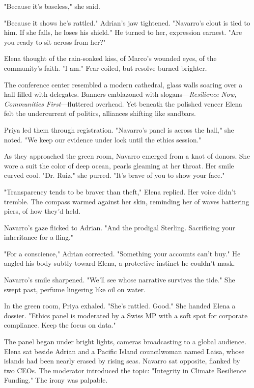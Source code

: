 "Because it's baseless," she said.

"Because it shows he's rattled." Adrian's jaw tightened. "Navarro's clout is tied to him. If she falls, he loses his shield." He turned to her, expression earnest. "Are you ready to sit across from her?"

Elena thought of the rain-soaked kiss, of Marco's wounded eyes, of the community's faith. "I am." Fear coiled, but resolve burned brighter.

The conference center resembled a modern cathedral, glass walls soaring over a hall filled with delegates. Banners emblazoned with slogans—\textit{Resilience Now}, \textit{Communities First}—fluttered overhead. Yet beneath the polished veneer Elena felt the undercurrent of politics, alliances shifting like sandbars.

Priya led them through registration. "Navarro's panel is across the hall," she noted. "We keep our evidence under lock until the ethics session."

As they approached the green room, Navarro emerged from a knot of donors. She wore a suit the color of deep ocean, pearls gleaming at her throat. Her smile curved cool. "Dr. Ruiz," she purred. "It's brave of you to show your face."

"Transparency tends to be braver than theft," Elena replied. Her voice didn't tremble. The compass warmed against her skin, reminding her of waves battering piers, of how they'd held.

Navarro's gaze flicked to Adrian. "And the prodigal Sterling. Sacrificing your inheritance for a fling."

"For a conscience," Adrian corrected. "Something your accounts can't buy." He angled his body subtly toward Elena, a protective instinct he couldn't mask.

Navarro's smile sharpened. "We'll see whose narrative survives the tide." She swept past, perfume lingering like oil on water.

In the green room, Priya exhaled. "She's rattled. Good." She handed Elena a dossier. "Ethics panel is moderated by a Swiss MP with a soft spot for corporate compliance. Keep the focus on data."

The panel began under bright lights, cameras broadcasting to a global audience. Elena sat beside Adrian and a Pacific Island councilwoman named Laisa, whose islands had been nearly erased by rising seas. Navarro sat opposite, flanked by two CEOs. The moderator introduced the topic: "Integrity in Climate Resilience Funding." The irony was palpable.

